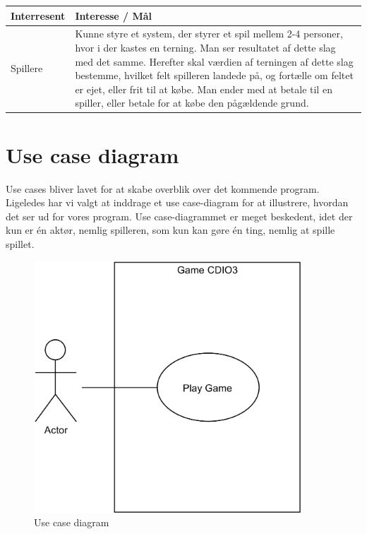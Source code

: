     \begin{tabular}{ | l | p{13cm} |}
      
      \hline
    \textbf{Interresent} & \textbf{Interesse / Mål} \\ \hline
    Spillere
    
    &
    
    Kunne styre et system, der styrer et spil mellem 2-4 personer, 
    hvor i der kastes en terning. Man ser resultatet af dette slag med det samme. Herefter skal værdien af terningen af dette slag bestemme, hvilket felt spilleren landede på, og fortælle om feltet er ejet, eller frit til at købe. Man ender med at betale til en spiller, eller betale for at købe den pågældende grund.
    \\ 
    \hline
      
    \hline
    \end{tabular}

\section{Use case diagram}
Use cases bliver lavet for at skabe overblik over det kommende program.
Ligeledes har vi valgt at inddrage et use case-diagram for at illustrere, hvordan det ser ud for vores program.
Use case-diagrammet er meget beskedent, idet der kun er én aktør, nemlig spilleren, som kun kan gøre én ting, nemlig at spille spillet.
\begin{figure}[H]
    \begin{center}
        \includegraphics[width=10cm]{graphics/usecases/UseCase1.png}
        \caption{Use case diagram}
        \label{fig:use_case_diagram}
    \end{center}
\end{figure}


